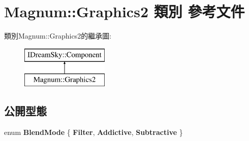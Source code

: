 \hypertarget{class_magnum_1_1_graphics2}{}\section{Magnum\+:\+:Graphics2 類別 參考文件}
\label{class_magnum_1_1_graphics2}
類別\+Magnum\+:\+:Graphics2的繼承圖\+:\begin{figure}[H]
\begin{center}
\leavevmode
\includegraphics[height=2.000000cm]{class_magnum_1_1_graphics2}
\end{center}
\end{figure}
\subsection*{公開型態}
\begin{DoxyCompactItemize}
\item 
enum {\bfseries Blend\+Mode} \{ {\bfseries Filter}, 
{\bfseries Addictive}, 
{\bfseries Subtractive}
 \}\hypertarget{class_magnum_1_1_graphics2_a5753d5bf0c8793c73370e14bb96a7b43}{}\label{class_magnum_1_1_graphics2_a5753d5bf0c8793c73370e14bb96a7b43}

\end{DoxyCompactItemize}
